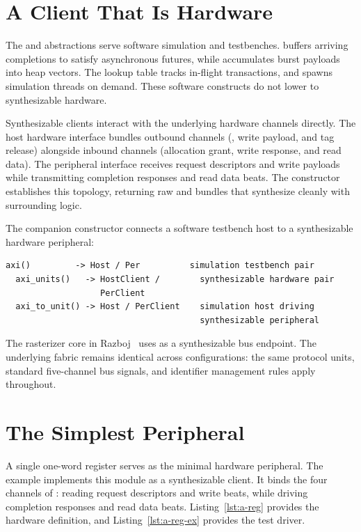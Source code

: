 \documentclass[journal,9pt]{IEEEtran}
\begin{document}
\section{A Client That Is Hardware}
\label{sec:a-hardware}

The  and  abstractions serve software simulation and
testbenches.  buffers arriving completions to satisfy
asynchronous futures, while  accumulates burst payloads into heap
vectors. The  lookup table tracks in-flight transactions, and
 spawns simulation threads on demand. These software constructs
do not lower to synthesizable hardware.

Synthesizable clients interact with the underlying hardware channels
directly. The host hardware interface bundles outbound channels (,
write payload, and tag release) alongside inbound channels (allocation
grant, write response, and read data). The peripheral interface receives
request descriptors and write payloads while transmitting completion
responses and read data beats. The  constructor
establishes this topology, returning raw  and
 bundles that synthesize cleanly with surrounding logic.

The companion constructor  connects a software
testbench host to a synthesizable hardware peripheral:

\begin{lstlisting}[style=ascii,frame=none,numbers=none]
  axi()         -> Host / Per          simulation testbench pair
  axi_units()   -> HostClient /        synthesizable hardware pair
                   PerClient
  axi_to_unit() -> Host / PerClient    simulation host driving
                                       synthesizable peripheral
\end{lstlisting}

The rasterizer core in Razboj~\cite{gpu} uses  as a
synthesizable bus endpoint. The underlying fabric remains identical across
configurations: the same protocol units, standard five-channel bus signals,
and identifier management rules apply throughout.

\section{The Simplest Peripheral}
\label{sec:a-simplest}

A single one-word register serves as the minimal hardware peripheral.
The example  implements this module as a synthesizable
client. It binds the four channels of : reading request
descriptors and write beats, while driving completion responses and read
data beats. Listing~\ref{lst:a-reg} provides the hardware definition, and
Listing~\ref{lst:a-reg-ex} provides the test driver.
\end{document}
